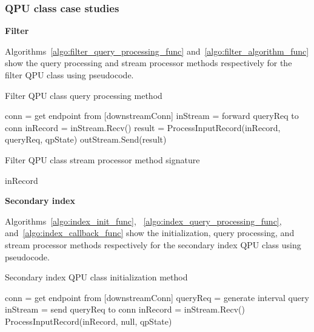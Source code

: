 \subsubsection{QPU class case studies}
\label{sec:qpu_class_examples}

\textbf{Filter}

Algorithms~\ref{algo:filter_query_processing_func} and~\ref{algo:filter_algorithm_func} show the query processing and
stream processor methods respectively for the filter QPU class using pseudocode.


\begin{algorithm}
\caption{Filter QPU class query processing method}
\label{algo:filter_query_processing_func}
\begin{algorithmic}
\State conn = get endpoint from [downstreamConn] 
\State inStream = forward queryReq to conn
\State inRecord = inStream.Recv()
\State result = ProcessInputRecord(inRecord, queryReq, qpState)
\State outStream.Send(result)
\EndIf
\EndWhile
\EndFunction
\end{algorithmic}
\end{algorithm}

\begin{algorithm}
\caption{Filter QPU class stream processor method signature}
\label{algo:filter_algorithm_func}
\begin{algorithmic}
\State \Return inRecord
\Else
\State \Return []
\EndIf
\EndFunction
\end{algorithmic}
\end{algorithm}


\bigskip
\noindent
\textbf{Secondary index}

Algorithms~\ref{algo:index_init_func}, ~\ref{algo:index_query_processing_func}, and~\ref{algo:index_callback_func}
show the initialization, query processing, and stream processor methods respectively for the secondary index QPU
class using pseudocode.

\begin{algorithm}
\caption{Secondary index QPU class initialization method}
\label{algo:index_init_func}
\begin{algorithmic}
\State conn = get endpoint from [downstreamConn] 
\State queryReq = generate interval query
\State inStream = send queryReq to conn
\State inRecord = inStream.Recv()
\State ProcessInputRecord(inRecord, null, qpState)
\EndWhile
\EndFunction
\end{algorithmic}
\end{algorithm}

